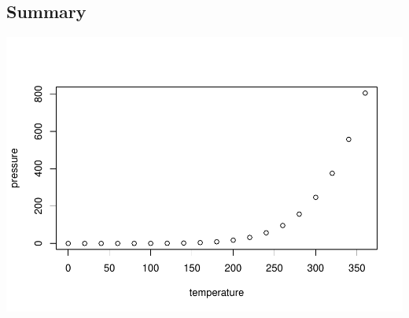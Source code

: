 \documentclass[
]{article}
\begin{document}
\subsection{Summary}

\includegraphics{Visualisation_Analysis_files/figure-latex/summary-1.pdf}
\end{document}

